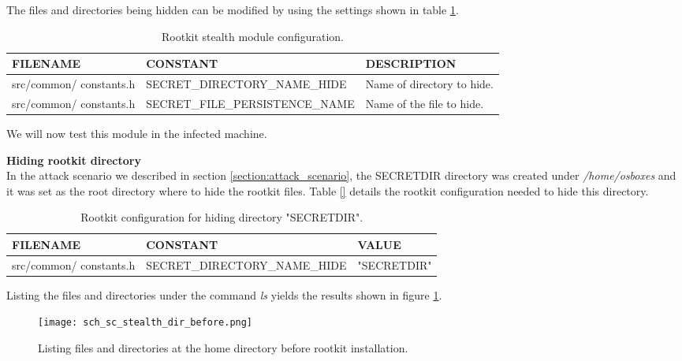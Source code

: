 The files and directories being hidden can be modified by using the settings shown in table \ref{table:rootkit_stealth_config}.

\begin{table}[htbp]
\begin{tabular}{|>{\centering\arraybackslash}p{3cm}|>{\centering\arraybackslash}p{4.5cm}|>{\centering\arraybackslash}p{6cm}|}
\hline
\textbf{FILENAME} & \textbf{CONSTANT} & \textbf{DESCRIPTION}\\
\hline
\hline
src/common/ constants.h & SECRET\_DIRECTORY\_NAME\_HIDE & Name of directory to hide.\\
\hline
src/common/ constants.h & SECRET\_FILE\_PERSISTENCE\_NAME & Name of the file to hide.\\
\hline
\end{tabular}
\caption{Rootkit stealth module configuration.}
\label{table:rootkit_stealth_config}
\end{table}

We will now test this module in the infected machine.

\textbf{Hiding rootkit directory}\\
In the attack scenario we described in section \ref{section:attack_scenario}, the SECRETDIR directory was created under \textit{/home/osboxes} and it was set as the root directory where to hide the rootkit files. Table \ref{} details the rootkit configuration needed to hide this directory.

\begin{table}[htbp]
\begin{tabular}{|>{\centering\arraybackslash}p{3cm}|>{\centering\arraybackslash}p{4.5cm}|>{\centering\arraybackslash}p{6cm}|}
\hline
\textbf{FILENAME} & \textbf{CONSTANT} & \textbf{VALUE}\\
\hline
\hline
src/common/ constants.h & SECRET\_DIRECTORY\_NAME\_HIDE & "SECRETDIR"\\
\hline
\end{tabular}
\caption{Rootkit configuration for hiding directory "SECRETDIR".}
\label{table:rootkit_stealth_config_dir}
\end{table}

Listing the files and directories under the command \textit{ls} yields the results shown in figure \ref{fig:sc_stealth_dir_before}.

\begin{figure}[htbp]
	\centering
	\texttt{[image: sch\_sc\_stealth\_dir\_before.png]}
	\caption{Listing files and directories at the home directory before rootkit installation.}
	\label{fig:sc_stealth_dir_before}
\end{figure}

